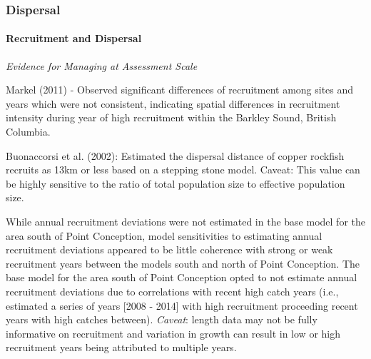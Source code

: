 \documentclass[11pt,
  english,
  a4paper,
]{article}
\begin{document}
\leavevmode\tagmcend\tagstructend\par


\hypertarget{dispersal}{%
\subsubsection{Dispersal}\label{dispersal}}

\leavevmode\tagmcend\tagstructend


\hypertarget{recruitment-and-dispersal}{%
\paragraph{Recruitment and Dispersal}\label{recruitment-and-dispersal}}

\leavevmode\tagmcend\tagstructend


\emph{Evidence for Managing at Assessment Scale}

\leavevmode\tagmcend\tagstructend\par


Markel {(2011)\leavevmode\tagmcend\tagstructend} - Observed significant differences of recruitment among sites and years which were not consistent, indicating spatial differences in recruitment intensity during year of high recruitment within the Barkley Sound, British Columbia.

\leavevmode\tagmcend\tagstructend\par


Buonaccorsi et al. {(2002)\leavevmode\tagmcend\tagstructend}: Estimated the dispersal distance of copper rockfish recruits as 13km or less based on a stepping stone model. Caveat: This value can be highly sensitive to the ratio of total population size to effective population size.

\leavevmode\tagmcend\tagstructend\par


While annual recruitment deviations were not estimated in the base model for the area south of Point Conception, model sensitivities to estimating annual recruitment deviations appeared to be little coherence with strong or weak recruitment years between the models south and north of Point Conception. The base model for the area south of Point Conception opted to not estimate annual recruitment deviations due to correlations with recent high catch years (i.e., estimated a series of years {[}2008 - 2014{]} with high recruitment proceeding recent years with high catches between). \emph{Caveat}: length data may not be fully informative on recruitment and variation in growth can result in low or high recruitment years being attributed to multiple years.
\end{document}

